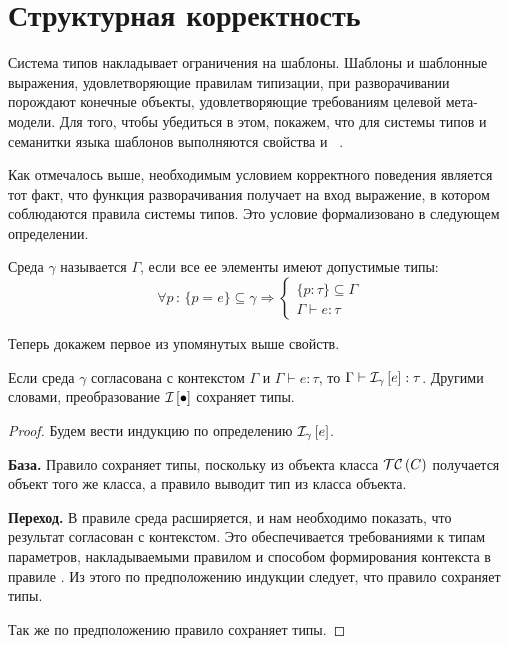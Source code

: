 \section{Структурная корректность}

Система типов накладывает ограничения на шаблоны. Шаблоны и шаблонные выражения, удовлетворяющие правилам типизации, при разворачивании порождают конечные объекты, удовлетворяющие требованиям целевой мета-модели.
Для того, чтобы убедиться в этом, покажем, что для системы типов и семанитки языка шаблонов выполняются свойства  и ~\cite{Pierce}. 

Как отмечалось выше, необходимым условием корректного поведения является тот факт, что функция разворачивания получает на вход выражение, в котором соблюдаются правила системы типов. Это условие формализовано в следующем определении.

\begin{Def}\label{agree}
Среда $\gamma$ называется  $\Gamma$, если все ее элементы имеют допустимые типы:
$$
	\forall p \, : \, 
		\{p = e\} \subseteq \gamma 
			\Rightarrow 
		\left\{\begin{array}{l}		
		\{p : \tau\} \subseteq \Gamma \\
		\Gamma \vdash e : \tau
		\end{array}\right.
$$
\end{Def}

Теперь докажем первое из упомянутых выше свойств.

\begin{Th}\label{ThTP}
Если среда $\gamma$ согласована с контекстом $\Gamma$ и \mbox{$\Gamma \vdash e : \tau$}, то \mbox{$\Gamma \vdash \mathcal{I}_{\gamma} \left[ e \right] : \tau$}. Другими словами, преобразование $\mathcal{I}_{} \left[ \bullet \right]$ сохраняет типы.
\end{Th}
\begin{proof}
Будем вести индукцию по определению $\mathcal{I}_{\gamma} \left[ e \right]$.

\noindent\textbf{База.} Правило  сохраняет типы, поскольку из объекта класса $\mathcal{TC}\left(C\right)$ получается объект того же класса, а правило  выводит тип из класса объекта.

\noindent\textbf{Переход.} 
В правиле  среда расширяется, и нам необходимо показать, что результат согласован с контекстом. Это обеспечивается требованиями к типам параметров, накладываемыми правилом  и способом формирования контекста в правиле . Из этого по предположению индукции следует, что правило  сохраняет типы.

Так же по предположению правило  сохраняет типы.
\end{proof}

